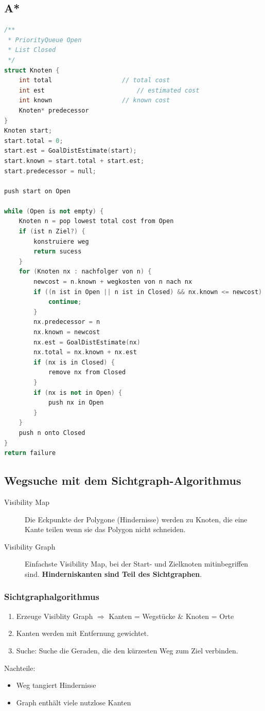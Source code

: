 \subsection{A*}
\begin{lstlisting}[language=c++]
/**
 * PriorityQueue Open
 * List Closed
 */
struct Knoten {
	int total 					// total cost
	int est							// estimated cost
	int known 					// known cost
	Knoten* predecessor
}
Knoten start;
start.total = 0;
start.est = GoalDistEstimate(start);
start.known = start.total + start.est;
start.predecessor = null;

push start on Open

while (Open is not empty) {
	Knoten n = pop lowest total cost from Open
	if (ist n Ziel?) {
		konstruiere weg
		return sucess
	}
	for (Knoten nx : nachfolger von n) {
		newcost = n.known + wegkosten von n nach nx
		if ((n ist in Open || n ist in Closed) && nx.known <= newcost) {
			continue;
		}
		nx.predecessor = n
		nx.known = newcost
		nx.est = GoalDistEstimate(nx)
		nx.total = nx.known + nx.est
		if (nx is in Closed) {
			remove nx from Closed
		}
		if (nx is not in Open) {
			push nx in Open
		}
	}
	push n onto Closed
}
return failure
\end{lstlisting}

\subsection{Wegsuche mit dem Sichtgraph-Algorithmus}
\begin{description}
	\item[Visibility Map] Die Eckpunkte der Polygone (Hindernisse) werden zu
		Knoten, die eine Kante teilen wenn sie das Polygon nicht schneiden.
	\item[Visibility Graph] Einfachste Visibility Map, bei der Start- und
		Zielknoten mitinbegriffen sind. \textbf{Hinderniskanten sind Teil des
		Sichtgraphen}.
\end{description}

\subsubsection{Sichtgraphalgorithmus}
\begin{enumerate}
	\item Erzeuge Visiblity Graph $\Rightarrow$ Kanten = Wegstücke \& Knoten =
		Orte
	\item Kanten werden mit Entfernung gewichtet.
	\item Suche: Suche die Geraden, die den kürzesten Weg zum Ziel verbinden.
\end{enumerate}
Nachteile:
\begin{itemize}
	\item Weg tangiert Hindernisse
	\item Graph enthält viele nutzlose Kanten
\end{itemize}

